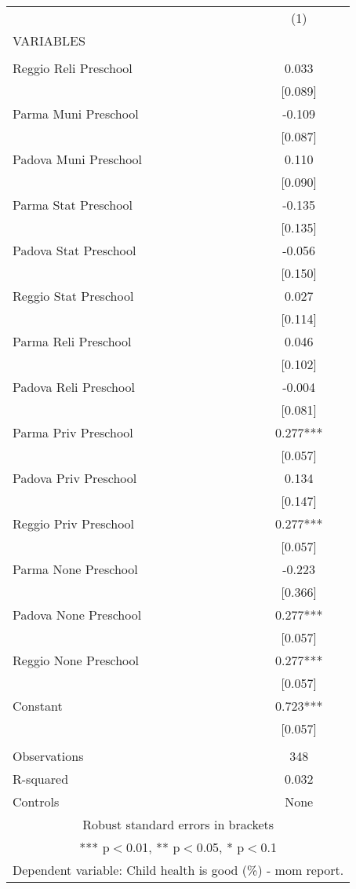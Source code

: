 \begin{tabular}{lc} \hline
 & (1) \\
VARIABLES &  \\ \hline
 &  \\
Reggio Reli Preschool & 0.033 \\
 & [0.089] \\
Parma Muni Preschool & -0.109 \\
 & [0.087] \\
Padova Muni Preschool & 0.110 \\
 & [0.090] \\
Parma Stat Preschool & -0.135 \\
 & [0.135] \\
Padova Stat Preschool & -0.056 \\
 & [0.150] \\
Reggio Stat Preschool & 0.027 \\
 & [0.114] \\
Parma Reli Preschool & 0.046 \\
 & [0.102] \\
Padova Reli Preschool & -0.004 \\
 & [0.081] \\
Parma Priv Preschool & 0.277*** \\
 & [0.057] \\
Padova Priv Preschool & 0.134 \\
 & [0.147] \\
Reggio Priv Preschool & 0.277*** \\
 & [0.057] \\
Parma None Preschool & -0.223 \\
 & [0.366] \\
Padova None Preschool & 0.277*** \\
 & [0.057] \\
Reggio None Preschool & 0.277*** \\
 & [0.057] \\
Constant & 0.723*** \\
 & [0.057] \\
 &  \\
Observations & 348 \\
R-squared & 0.032 \\
 Controls & None \\ \hline
\multicolumn{2}{c}{ Robust standard errors in brackets} \\
\multicolumn{2}{c}{ *** p$<$0.01, ** p$<$0.05, * p$<$0.1} \\
\multicolumn{2}{c}{ Dependent variable: Child health is good (\%) - mom report.} \\
\end{tabular}
